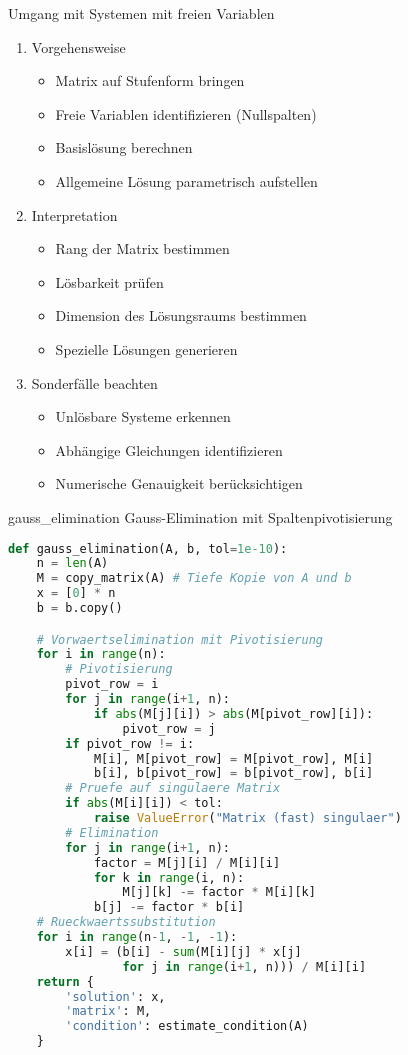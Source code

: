 \begin{KR}{Umgang mit Systemen mit freien Variablen}
\begin{enumerate}
    \item Vorgehensweise
    \begin{itemize}
        \item Matrix auf Stufenform bringen
        \item Freie Variablen identifizieren (Nullspalten)
        \item Basislösung berechnen
        \item Allgemeine Lösung parametrisch aufstellen
    \end{itemize}
    
    \item Interpretation
    \begin{itemize}
        \item Rang der Matrix bestimmen
        \item Lösbarkeit prüfen
        \item Dimension des Lösungsraums bestimmen
        \item Spezielle Lösungen generieren
    \end{itemize}
    
    \item Sonderfälle beachten
    \begin{itemize}
        \item Unlösbare Systeme erkennen
        \item Abhängige Gleichungen identifizieren
        \item Numerische Genauigkeit berücksichtigen
    \end{itemize}
\end{enumerate}
\end{KR}

\begin{examplecode}{gauss\_elimination} Gauss-Elimination mit Spaltenpivotisierung
\begin{lstlisting}[language=Python, style=basesmol]
def gauss_elimination(A, b, tol=1e-10):
    n = len(A)
    M = copy_matrix(A) # Tiefe Kopie von A und b
    x = [0] * n
    b = b.copy()

    # Vorwaertselimination mit Pivotisierung
    for i in range(n):
        # Pivotisierung
        pivot_row = i
        for j in range(i+1, n):
            if abs(M[j][i]) > abs(M[pivot_row][i]):
                pivot_row = j
        if pivot_row != i:
            M[i], M[pivot_row] = M[pivot_row], M[i]
            b[i], b[pivot_row] = b[pivot_row], b[i]
        # Pruefe auf singulaere Matrix
        if abs(M[i][i]) < tol:
            raise ValueError("Matrix (fast) singulaer")
        # Elimination
        for j in range(i+1, n):
            factor = M[j][i] / M[i][i]
            for k in range(i, n):
                M[j][k] -= factor * M[i][k]
            b[j] -= factor * b[i]
    # Rueckwaertssubstitution
    for i in range(n-1, -1, -1):
        x[i] = (b[i] - sum(M[i][j] * x[j] 
                for j in range(i+1, n))) / M[i][i]
    return {
        'solution': x,
        'matrix': M,
        'condition': estimate_condition(A)
    }
\end{lstlisting}
\end{examplecode}

